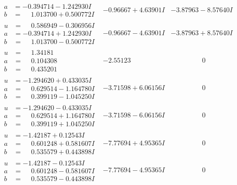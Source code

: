 \documentclass[1p]{elsarticle_modified}
\theoremstyle{definition}
\begin{document}
$$\begin{array}{c|c|c}
\begin{aligned}
a &= -0.394714 - 1.242930 I \\
b &= \phantom{-}1.013700 + 0.500772 I\end{aligned}
 & -0.96667 + 4.63901 I & -3.87963 - 8.57640 I \\ \hline\begin{aligned}
u &= \phantom{-}0.586949 - 0.306956 I \\
a &= -0.394714 + 1.242930 I \\
b &= \phantom{-}1.013700 - 0.500772 I\end{aligned}
 & -0.96667 - 4.63901 I & -3.87963 + 8.57640 I \\ \hline\begin{aligned}
u &= \phantom{-}1.34181\phantom{ +0.000000I} \\
a &= \phantom{-}0.104308\phantom{ +0.000000I} \\
b &= \phantom{-}0.435201\phantom{ +0.000000I}\end{aligned}
 & -2.55123\phantom{ +0.000000I} & \phantom{-0.000000 } 0 \\ \hline\begin{aligned}
u &= -1.294620 + 0.433035 I \\
a &= \phantom{-}0.629514 - 1.164780 I \\
b &= \phantom{-}0.399119 - 1.045250 I\end{aligned}
 & -3.71598 + 6.06156 I & \phantom{-0.000000 } 0 \\ \hline\begin{aligned}
u &= -1.294620 - 0.433035 I \\
a &= \phantom{-}0.629514 + 1.164780 I \\
b &= \phantom{-}0.399119 + 1.045250 I\end{aligned}
 & -3.71598 - 6.06156 I & \phantom{-0.000000 } 0 \\ \hline\begin{aligned}
u &= -1.42187 + 0.12543 I \\
a &= \phantom{-}0.601248 + 0.581607 I \\
b &= \phantom{-}0.535579 + 0.443898 I\end{aligned}
 & -7.77694 + 4.95365 I & \phantom{-0.000000 } 0 \\ \hline\begin{aligned}
u &= -1.42187 - 0.12543 I \\
a &= \phantom{-}0.601248 - 0.581607 I \\
b &= \phantom{-}0.535579 - 0.443898 I\end{aligned}
 & -7.77694 - 4.95365 I & \phantom{-0.000000 } 0\\

\end{array}$$
\end{document}
